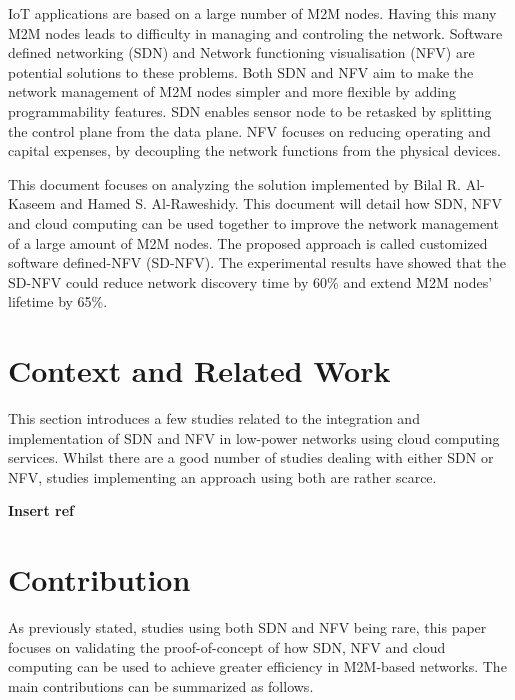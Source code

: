 \documentclass[10pt,journal,compsoc]{IEEEtran}
\begin{document}
IoT applications are based on a large number of M2M nodes. 
Having this many M2M nodes leads to difficulty in 
managing and controling the network. Software defined networking (SDN) 
and Network functioning visualisation (NFV) are potential solutions to 
these problems. Both SDN and NFV aim to make the network management 
of M2M nodes simpler and more flexible by adding programmability features. 
SDN enables sensor node to be retasked by splitting the control plane from 
the data plane. NFV focuses on reducing operating and capital expenses, 
by decoupling the network functions from the physical devices. 

This document focuses on analyzing the solution implemented by Bilal 
R. Al-Kaseem and Hamed S. Al-Raweshidy. This document will detail 
how SDN, NFV and cloud computing can be used together to improve the 
network management of a large amount of M2M nodes. 
The proposed approach is called customized software defined-NFV (SD-NFV). 
The experimental results have showed that the SD-NFV could reduce 
network discovery time by 60\% and extend M2M nodes' lifetime by 65\%.

\section{Context and Related Work}\label{sec:context}

This section introduces a few studies related to the integration and 
implementation of SDN and NFV in low-power networks using cloud 
computing services. Whilst there are a good number of studies dealing with 
either SDN or NFV, studies implementing an approach using both are 
rather scarce.

\textbf{Insert ref}

\section{Contribution}\label{sec:contribution}

As previously stated, studies using both SDN and NFV being rare, this paper 
focuses on validating the proof-of-concept of how SDN, NFV and cloud 
computing can be used to achieve greater efficiency in M2M-based networks.
The main contributions can be summarized as follows.
\end{document}
